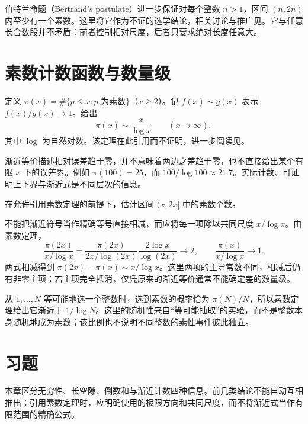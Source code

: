 \documentclass[UTF8,12pt,a4paper,fontset=fandol]{ctexbook}
\begin{document}
伯特兰命题（Bertrand's postulate）进一步保证对每个整数 $n>1$，区间 $(n,2n)$ 内至少有一个素数。这里将它作为不证的选学结论，相关讨论与推广见\cite{sondow-bertrand}。它与任意长合数段并不矛盾：前者控制相对尺度，后者只要求绝对长度任意大。

\section{素数计数函数与数量级}

定义 $\pi(x)=\#\{p\le x:p\text{ 为素数}\}$（$x\ge2$）。记 $f(x)\sim g(x)$ 表示 $f(x)/g(x)\to1$。给出
\begin{equation}
 \pi(x)\sim\frac{x}{\log x}\qquad(x\to\infty),
 \label{eq:prime-number-theorem}
\end{equation}
其中 $\log$ 为自然对数。该定理在此引用而不证明，进一步阅读见\cite{kedlaya-pnt}。

渐近等价描述相对误差趋于零，并不意味着两边之差趋于零，也不直接给出某个有限 $x$ 下的误差界。例如 $\pi(100)=25$，而 $100/\log100\approx21.7$。实际计数、可证明上下界与渐近式是不同层次的信息。

\begin{example}[如何正确使用渐近等价]
在允许引用素数定理的前提下，估计区间 $(x,2x]$ 中的素数个数。
\end{example}
\begin{solve}
不能把渐近符号当作精确等号直接相减，而应将每一项除以共同尺度 $x/\log x$。由素数定理，
\[
 \frac{\pi(2x)}{x/\log x}
 =\frac{\pi(2x)}{2x/\log(2x)}\frac{2\log x}{\log(2x)}\longrightarrow2,
 \qquad \frac{\pi(x)}{x/\log x}\longrightarrow1.
\]
两式相减得到 $\pi(2x)-\pi(x)\sim x/\log x$。这里两项的主导常数不同，相减后仍有非零主项；若主项完全抵消，仅凭原来的渐近等价通常不能确定差的数量级。
\end{solve}

从 $1,\ldots,N$ 等可能地选一个整数时，选到素数的概率恰为 $\pi(N)/N$，所以素数定理给出它渐近于 $1/\log N$。这里的随机性来自“等可能抽取”的实验，而不是整数本身随机地成为素数；该比例也不说明不同整数的素性事件彼此独立。

\section{习题}

本章区分无穷性、长空隙、倒数和与渐近计数四种信息。前几类结论不能自动互相推出；引用素数定理时，应明确使用的极限方向和共同尺度，而不将渐近式当作有限范围的精确公式。
\end{document}
